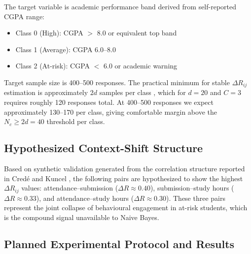 \documentclass[conference]{IEEEtran}
\begin{document}
The target variable is academic performance band derived from
self-reported CGPA range:
\begin{itemize}
  \item Class 0 (High): CGPA $>$ 8.0 or equivalent top band
  \item Class 1 (Average): CGPA 6.0--8.0
  \item Class 2 (At-risk): CGPA $<$ 6.0 or academic warning
\end{itemize}

Target sample size is 400--500 responses.
The practical minimum for stable $\Delta R_{ij}$ estimation is
approximately $2d$ samples per class \cite{fan2015}, which for $d = 20$ and
$C = 3$ requires roughly 120 responses total.
At 400--500 responses we expect approximately 130--170 per class, giving
comfortable margin above the $N_c \ge 2d = 40$ threshold per class.

\subsection{Hypothesized Context-Shift Structure}

Based on synthetic validation generated from the correlation structure
reported in Cred\'{e} and Kuncel \cite{crede2008}, the following pairs are
hypothesized to show the highest $\Delta R_{ij}$ values:
attendance--submission ($\Delta R \approx 0.40$),
submission--study hours ($\Delta R \approx 0.33$), and
attendance--study hours ($\Delta R \approx 0.30$).
These three pairs represent the joint collapse of behavioural engagement
in at-risk students, which is the compound signal unavailable to Naive Bayes.

\subsection{Planned Experimental Protocol and Results}

\end{document}
